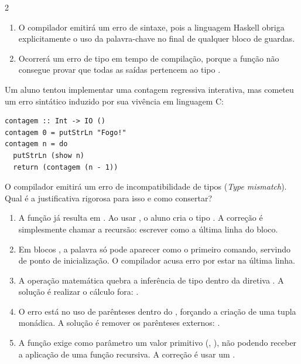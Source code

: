 \documentclass[a4paper,10pt,brazil]{article}
\begin{document}
\begin{multicols}{2}
\begin{enumerate}
  \item O compilador emitirá um erro de sintaxe, pois a linguagem Haskell obriga explicitamente o uso da palavra-chave  no final de qualquer bloco de guardas.

  \item Ocorrerá um erro de tipo em tempo de compilação, porque a função não consegue provar que todas as saídas pertencem ao tipo .


\end{enumerate}

Um aluno tentou implementar uma contagem regressiva interativa, mas cometeu um erro sintático induzido por sua vivência em linguagem C:

\begin{verbatim}
contagem :: Int -> IO ()
contagem 0 = putStrLn "Fogo!"
contagem n = do
  putStrLn (show n)
  return (contagem (n - 1))
\end{verbatim}

O compilador emitirá um erro de incompatibilidade de tipos (\emph{Type mismatch}). Qual é a justificativa rigorosa para isso e como consertar?

\begin{enumerate}
  \item A função  já resulta em . Ao usar , o aluno cria o tipo . A correção é simplesmente chamar a recursão: escrever  como a última linha do bloco.

  \item Em blocos , a palavra  só pode aparecer como o primeiro comando, servindo de ponto de inicialização. O compilador acusa erro por estar na última linha.

  \item A operação matemática  quebra a inferência de tipo dentro da diretiva . A solução é realizar o cálculo fora: .
  \item O erro está no uso de parênteses dentro do , forçando a criação de uma tupla monádica. A solução é remover os parênteses externos: .

  \item A função  exige como parâmetro um valor primitivo (, ), não podendo receber a aplicação de uma função recursiva. A correção é usar um .



\end{enumerate}
\end{multicols}
\end{document}
